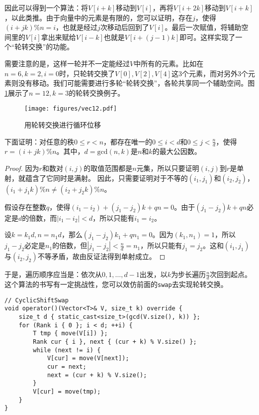 因此可以得到一个算法：将$V[i+k]$移动到$V[i]$，再将$V[i+2k]$移动到$V[i+k]$，以此类推。由于向量中的元素是有限的，您可以证明，存在$j$，使得$(i+jk) \% n = i$，也就是经过$j$次移动后回到了$V[i]$。最后一次赋值，将辅助空间里的$V[i]$拿出来赋给$V[i-k]$也就是$V[i+(j-1)k]$即可。这样实现了一个“轮转交换”的功能。

需要注意的是，这样一轮并不一定能经过$V$中所有的元素。比如在$n=6, k=2, i=0$时，只轮转交换了$V[0],V[2],V[4]$这3个元素，而对另外3个元素则没有移动。我们可能需要进行多轮“轮转交换”，各轮共享同一个辅助空间。图\ref{fig:vec12}展示了$n=12,k=3$的轮转交换例子。

\begin{figure}
  \centering
  \texttt{[image: figures/vec12.pdf]}
  \caption{用轮转交换进行循环位移}
  \label{fig:vec12}
\end{figure}

下面证明：对任意的秩$0 \le r < n $，都存在唯一的$0 \le i < d$和$0 \le j < \frac nd$，使得$r = (i+jk) \% n$。其中，$d = \mathrm{gcd}(n,k)$是$n$和$k$的最大公因数。

\begin{proof}
因为$r$和数对$(i,j)$的取值范围都是$n$元集，所以只要证明$(i,j)$到$r$是单射，就蕴含了它同时是满射。
因此，只需要证明对于不等的$(i_1,j_1)$和$(i_2,j_2)$，$(i_1+j_1k) \%n\ne(i_2+j_2k)\%n$。

假设存在整数$q$，使得$(i_1-i_2)+(j_1-j_2)k+qn=0$。由于$(j_1-j_2)k+qn$必定是$d$的倍数，而$|i_1-i_2|<d$，所以只能有$i_1=i_2$。

设$k=k_1d,n=n_1d$，那么$(j_1-j_2)k_1+qn_1=0$。因为$(k_1,n_1)=1$，所以$j_1-j_2$必定是$n_1$的倍数，但$|j_1-j_2|<\frac nd=n_1$，所以只能有$j_1=j_2$。这和$(i_1,j_1)$与$(i_2,j_2)$不等矛盾，故由反证法得到单射成立。
\end{proof}

于是，遍历顺序应当是：依次从$0,1,\dots,d-1$出发，以$k$为步长遍历$\frac nd$次回到起点。这个算法的书写有一定挑战性，您可以效仿前面的\lstinline{swap}去实现轮转交换。

\begin{lstlisting}
// CyclicShiftSwap
void operator()(Vector<T>& V, size_t k) override {
    size_t d { static_cast<size_t>(gcd(V.size(), k)) };
    for (Rank i { 0 }; i < d; ++i) {
        T tmp { move(V[i]) };
        Rank cur { i }, next { (cur + k) % V.size() };
        while (next != i) {
            V[cur] = move(V[next]);
            cur = next;
            next = (cur + k) % V.size();
        }
        V[cur] = move(tmp);
    }
}
\end{lstlisting}

